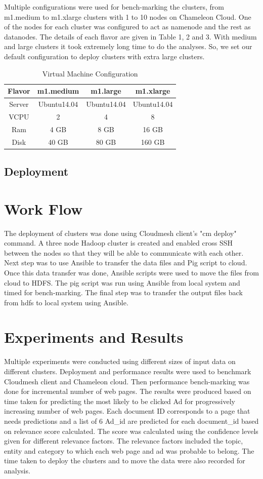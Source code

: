 \documentclass[9pt,twocolumn,twoside]{../../styles/osajnl}
\begin{document}
Multiple configurations were used for bench-marking the clusters, from m1.medium to m1.xlarge clusters with 1 to 10 nodes on Chameleon Cloud. One of the nodes for each cluster was configured to act as namenode and the rest as datanodes. The details of each flavor are given in Table 1, 2 and 3. With medium and large clusters it took extremely long time to do the analyses. So, we set our default configuration to deploy clusters with extra large clusters.
\begin{table}
\begin{tabular}{|c|c|c|c|}
\hline
    Flavor & m1.medium & m1.large & m1.xlarge \\ \hline
    Server & Ubuntu14.04 & Ubuntu14.04 & Ubuntu14.04 \\ \hline
    VCPU & 2 & 4 & 8 \\\hline
    Ram & 4 GB & 8 GB & 16 GB \\\hline
    Disk & 40 GB & 80 GB & 160 GB \\\hline
\end{tabular}
\caption{Virtual Machine Configuration}
\end{table}
\subsection{Deployment}

\section{Work Flow}
The deployment of clusters was done using Cloudmesh client's "cm deploy" command. A three node Hadoop cluster is created and enabled cross SSH between the nodes so that they will be able to communicate with each other. Next step was to use Ansible to transfer the data files and Pig script to cloud. Once this data transfer was done, Ansible scripts were used to move the files from cloud to HDFS. The pig script was run using Ansible from local system and timed for bench-marking. The final step was to transfer the output files back from hdfs to local system using Ansible.

\section{Experiments and Results}
Multiple experiments were conducted using different sizes of input data on different clusters. Deployment and performance results were used to benchmark Cloudmesh client and Chameleon cloud. Then performance bench-marking was done for incremental number of web pages. The results were produced based on time taken for predicting the most likely to be clicked Ad for progressively increasing number of web pages. Each document ID corresponds to a page that needs predictions and a list of 6 Ad\_id are predicted for each document\_id based on relevance score calculated. The score was calculated using the confidence levels given for different relevance factors. The relevance factors included the topic, entity and category to which each web page and ad was probable to belong. The time taken to deploy the clusters and to move the data were also recorded for analysis.
\end{document}
